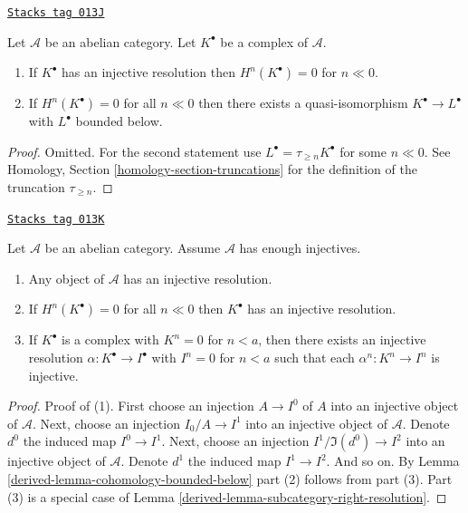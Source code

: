 \begin{lemma}
\label{derived-lemma-cohomology-bounded-below}
\href{https://stacks.math.columbia.edu/tag/013J}{\texttt{Stacks tag 013J}}

Let $\mathcal{A}$ be an abelian category.
Let $K^\bullet$ be a complex of $\mathcal{A}$.
\begin{enumerate}
\item If $K^\bullet$ has an injective resolution then
$H^n(K^\bullet) = 0$ for $n \ll 0$.
\item If $H^n(K^\bullet) = 0$ for all $n \ll 0$ then there
exists a quasi-isomorphism $K^\bullet \to L^\bullet$
with $L^\bullet$ bounded below.
\end{enumerate}
\end{lemma}

\begin{proof}
Omitted. For the second statement use
$L^\bullet = \tau_{\geq n}K^\bullet$ for
some $n \ll 0$. See
Homology, Section \ref{homology-section-truncations}
for the definition of the truncation $\tau_{\geq n}$.
\end{proof}

\begin{lemma}
\label{derived-lemma-injective-resolutions-exist}
\href{https://stacks.math.columbia.edu/tag/013K}{\texttt{Stacks tag 013K}}

Let $\mathcal{A}$ be an abelian category.
Assume $\mathcal{A}$ has enough injectives.
\begin{enumerate}
\item Any object of $\mathcal{A}$ has an injective resolution.
\item If $H^n(K^\bullet) = 0$ for all $n \ll 0$ then
$K^\bullet$ has an injective resolution.
\item If $K^\bullet$ is a complex with $K^n = 0$ for $n < a$, then
there exists an injective resolution $\alpha : K^\bullet \to I^\bullet$
with $I^n = 0$ for $n < a$ such that each $\alpha^n : K^n \to I^n$ is
injective.
\end{enumerate}
\end{lemma}

\begin{proof}

Proof of (1). First choose an injection $A \to I^0$ of $A$ into an
injective object of $\mathcal{A}$. Next, choose an injection
$I_0/A \to I^1$ into an injective object of $\mathcal{A}$.
Denote $d^0$ the induced map $I^0 \to I^1$.
Next, choose an injection $I^1/\Im(d^0) \to I^2$ into
an injective object of $\mathcal{A}$. Denote $d^1$ the induced
map $I^1 \to I^2$. And so on.
By Lemma \ref{derived-lemma-cohomology-bounded-below} part (2) follows from part (3).
Part (3) is a special case of
Lemma \ref{derived-lemma-subcategory-right-resolution}.
\end{proof}

